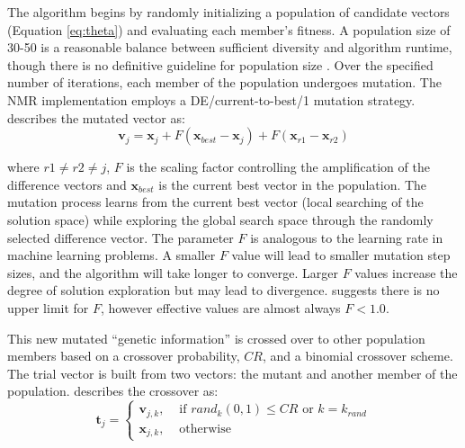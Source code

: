 The algorithm begins by randomly initializing a population of candidate vectors (Equation \ref{eq:theta}) and evaluating each member's fitness. A population size of 30-50 is a reasonable balance between sufficient diversity and algorithm runtime, though there is no definitive guideline for population size \citep{piotrowski2017review,balkaya20173d}. Over the specified number of iterations, each member of the population undergoes mutation. The \gls{NMR} implementation employs a DE/current-to-best/1 mutation strategy. \cite{georgioudakis2020comparative} describes the mutated vector as:
\begin{equation}
    \mathbf{v}_{j} = \mathbf{x}_{j} + F(\mathbf{x}_{best}-\mathbf{x}_{j}) + F(\mathbf{x}_{r1} - \mathbf{x}_{r2})
    \label{eq:mutation}
\end{equation}

\lowercase{Where} $r1 \neq r2 \neq j$, $F$ is the scaling factor controlling the amplification of the difference vectors and $\mathbf{x}_{best}$ is the current best vector in the population. The mutation process learns from the current best vector (local searching of the solution space) while exploring the global search space through the randomly selected difference vector. The parameter $F$ is analogous to the learning rate in machine learning problems. A smaller $F$ value will lead to smaller mutation step sizes, and the algorithm will take longer to converge. Larger $F$ values increase the degree of solution exploration but may lead to divergence. \cite{price2013differential} suggests there is no upper limit for $F$, however effective values are almost always $F < 1.0$.

This new mutated ``genetic information'' is crossed over to other population members based on a crossover probability, $CR$, and a binomial crossover scheme. The trial vector is built from two vectors: the mutant and another member of the population. \cite{price2013differential} describes the crossover as:
\begin{equation}
    \mathbf{t}_{j} =
    \begin{cases}
        \mathbf{v}_{j, k}, & \text{ if }rand_{k}(0,1) \leq CR \text{ or } k=k_{rand} \\
        \mathbf{x}_{j, k}, & \text{ otherwise }
    \end{cases}
    \label{eq:crossover}
\end{equation}


